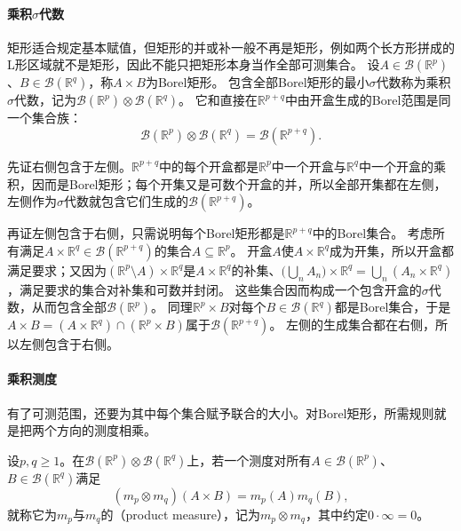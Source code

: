 \paragraph{乘积$\sigma$代数}

矩形适合规定基本赋值，但矩形的并或补一般不再是矩形，例如两个长方形拼成的L形区域就不是矩形，因此不能只把矩形本身当作全部可测集合。
设$A\in\mathcal B(\mathbb R^p)$、$B\in\mathcal B(\mathbb R^q)$，称$A\times B$为Borel矩形。
包含全部Borel矩形的最小$\sigma$代数称为乘积$\sigma$代数，记为$\mathcal B(\mathbb R^p)\otimes\mathcal B(\mathbb R^q)$。
它和直接在$\mathbb R^{p+q}$中由开盒生成的Borel范围是同一个集合族：
\begin{equation}
 \mathcal B(\mathbb R^p)\otimes\mathcal B(\mathbb R^q)=\mathcal B(\mathbb R^{p+q}).
 \label{eq:comb-borel-product-structure}
\end{equation}

先证右侧包含于左侧。$\mathbb R^{p+q}$中的每个开盒都是$\mathbb R^p$中一个开盒与$\mathbb R^q$中一个开盒的乘积，因而是Borel矩形；每个开集又是可数个开盒的并，所以全部开集都在左侧，左侧作为$\sigma$代数就包含它们生成的$\mathcal B(\mathbb R^{p+q})$。

再证左侧包含于右侧，只需说明每个Borel矩形都是$\mathbb R^{p+q}$中的Borel集合。
考虑所有满足$A\times\mathbb R^q\in\mathcal B(\mathbb R^{p+q})$的集合$A\subseteq\mathbb R^p$。
开盒$A$使$A\times\mathbb R^q$成为开集，所以开盒都满足要求；又因为$(\mathbb R^p\setminus A)\times\mathbb R^q$是$A\times\mathbb R^q$的补集、$\bigl(\bigcup_nA_n\bigr)\times\mathbb R^q=\bigcup_n(A_n\times\mathbb R^q)$，满足要求的集合对补集和可数并封闭。
这些集合因而构成一个包含开盒的$\sigma$代数，从而包含全部$\mathcal B(\mathbb R^p)$。
同理$\mathbb R^p\times B$对每个$B\in\mathcal B(\mathbb R^q)$都是Borel集合，于是
$A\times B=(A\times\mathbb R^q)\cap(\mathbb R^p\times B)$属于$\mathcal B(\mathbb R^{p+q})$。
左侧的生成集合都在右侧，所以左侧包含于右侧。

\paragraph{乘积测度}

有了可测范围，还要为其中每个集合赋予联合的大小。对Borel矩形，所需规则就是把两个方向的测度相乘。

\begin{definition}[乘积测度]
\label{def:analysis-product-measure}
设$p,q\geq1$。在$\mathcal B(\mathbb R^p)\otimes\mathcal B(\mathbb R^q)$上，若一个测度对所有$A\in\mathcal B(\mathbb R^p)$、$B\in\mathcal B(\mathbb R^q)$满足
\begin{equation}
 (m_p\otimes m_q)(A\times B)=m_p(A)m_q(B),
 \label{eq:comb-product-measure-rectangle}
\end{equation}
就称它为$m_p$与$m_q$的（product measure），记为$m_p\otimes m_q$，其中约定$0\cdot\infty=0$。
\end{definition}

